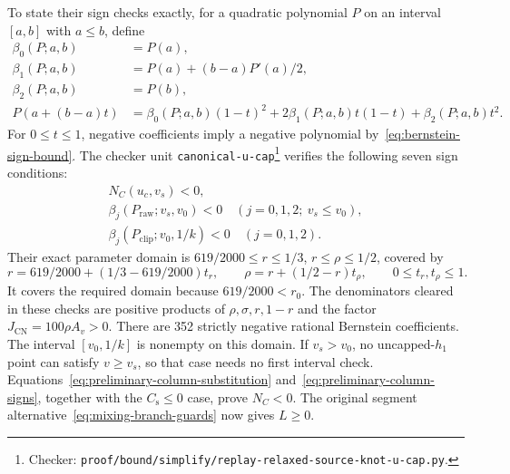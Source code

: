 \documentclass[11pt]{article}
\theoremstyle{remark}
\theoremstyle{plain}
\begin{document}
To state their sign checks exactly, for a quadratic polynomial $P$
on an interval $[a,b]$ with $a\le b$, define
\begin{equation}
 \begin{aligned}
 \beta_0(P;a,b)&=P(a),\\
 \beta_1(P;a,b)&=P(a)+(b-a)P'(a)/2,\\
 \beta_2(P;a,b)&=P(b),\\
 P(a+(b-a)t)&=\beta_0(P;a,b)(1-t)^2
          +2\beta_1(P;a,b)t(1-t)+\beta_2(P;a,b)t^2.
 \end{aligned}
 \label{eq:quadratic-bernstein}
\end{equation}
For $0\le t\le1$, negative coefficients imply a negative polynomial
by~\eqref{eq:bernstein-sign-bound}. The checker unit
\nolinkurl{canonical-u-cap}\footnote{Checker:
\nolinkurl{proof/bound/simplify/replay-relaxed-source-knot-u-cap.py}.\label{fn:checker-canonical-u-cap}} verifies the following seven sign conditions:
\begin{equation}
 \begin{gathered}
 N_C(u_c,v_s)<0,\\
 \beta_j(P_{\mathrm{raw}};v_s,v_0)<0\quad(j=0,1,2;\ v_s\le v_0),\\
 \beta_j(P_{\mathrm{clip}};v_0,1/k)<0\quad(j=0,1,2).
 \end{gathered}
 \label{eq:preliminary-column-signs}
\end{equation}
Their exact parameter domain is $619/2000\le r\le1/3$,
$r\le\rho\le1/2$, covered by
\begin{equation}
 r=619/2000+(1/3-619/2000)t_r,\qquad
 \rho=r+(1/2-r)t_\rho,\qquad 0\le t_r,t_\rho\le1.
 \label{eq:preliminary-sign-domain}
\end{equation}
It covers the required domain because $619/2000<r_0$.
The denominators cleared in these checks are positive products
of $\rho,\sigma,r,1-r$ and the factor
$J_{\mathrm{CN}}=100\rho A_v>0$. There are 352 strictly negative
rational Bernstein coefficients. The interval $[v_0,1/k]$ is
nonempty on this domain. If $v_s>v_0$, no uncapped-$h_1$ point can
satisfy $v\ge v_s$, so that case needs no first interval check.
Equations~\eqref{eq:preliminary-column-substitution}
and~\eqref{eq:preliminary-column-signs}, together with the
$C_{\mathrm s}\le0$ case, prove $N_C<0$. The original segment
alternative~\eqref{eq:mixing-branch-guards} now gives $L\ge0$.
\end{document}
